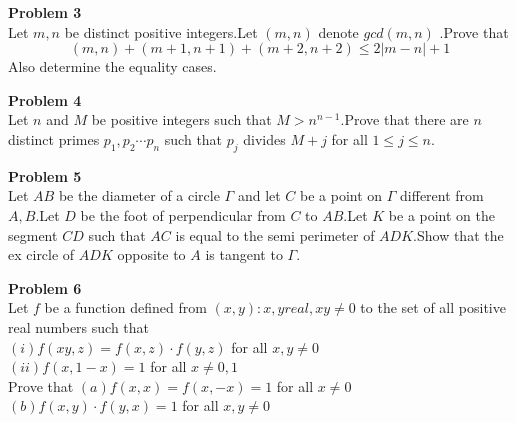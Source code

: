 \documentclass{article}
\begin{document}
\textbf{Problem 3}\\
Let $m,n$ be distinct positive integers.Let $(m,n)$ denote $gcd(m,n)$ .Prove that $$(m,n) + (m+1,n+1) + (m+2,n+2) \le 2|m-n| + 1 $$Also determine the equality cases.\newline



\textbf{Problem 4}\\
Let $n$ and $M$ be positive integers such that $M>n^{n-1}$.Prove that there are $n$ distinct primes $p_1,p_2 \cdots p_n$ such that $p_j$ divides $M + j$ for all $1 \le j \le n$.\newline


\textbf{Problem 5}\\
Let $AB$ be the diameter of a circle $\Gamma$ and let $C$ be a point on $\Gamma$ different from $A,B$.Let $D$ be the foot of perpendicular from $C$ to $AB$.Let $K$ be a point on the segment $CD$ such that $AC$ is equal to the semi perimeter of $ADK$.Show that the ex circle of $ADK$ opposite to $A$ is tangent to $\Gamma$.
\newline



\textbf{Problem 6}\\
Let $f$ be a function defined from ${{(x,y) : x,y real, xy\ne 0}}$ to the set of all positive real numbers such that\\
$ (i) f(xy,z)= f(x,z)\cdot f(y,z)$ for all $x,y \ne 0$\\
$ (ii) f(x,1-x) = 1 $ for all $x \ne 0,1$\\
Prove that
$ (a) f(x,x) = f(x,-x) = 1$ for all $x \ne 0$\\
$(b) f(x,y)\cdot f(y,x) = 1 $ for all $x,y \ne 0$\\
\end{document}
